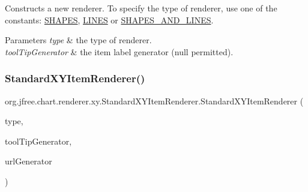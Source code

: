 Constructs a new renderer. To specify the type of renderer, use one of the constants\+: \mbox{\hyperlink{classorg_1_1jfree_1_1chart_1_1renderer_1_1xy_1_1_standard_x_y_item_renderer_a1a41cb6fbaeb923f922123f5c7d59111}{S\+H\+A\+P\+ES}}, \mbox{\hyperlink{classorg_1_1jfree_1_1chart_1_1renderer_1_1xy_1_1_standard_x_y_item_renderer_ad1319e29d63456c4781652b08df84d49}{L\+I\+N\+ES}} or \mbox{\hyperlink{classorg_1_1jfree_1_1chart_1_1renderer_1_1xy_1_1_standard_x_y_item_renderer_a058a54d8d7278e5ee575323faa33ad8a}{S\+H\+A\+P\+E\+S\+\_\+\+A\+N\+D\+\_\+\+L\+I\+N\+ES}}.


\begin{DoxyParams}{Parameters}
{\em type} & the type of renderer. \\
\hline
{\em tool\+Tip\+Generator} & the item label generator ({\ttfamily null} permitted). \\
\hline
\end{DoxyParams}
\mbox{\label{classorg_1_1jfree_1_1chart_1_1renderer_1_1xy_1_1_standard_x_y_item_renderer_ac15ad61a66b81408afc0e616be8a1e5c}} 
\subsubsection{\texorpdfstring{Standard\+X\+Y\+Item\+Renderer()}{StandardXYItemRenderer()}\hspace{0.1cm}{\footnotesize\ttfamily [4/4]}}
{\footnotesize\ttfamily org.\+jfree.\+chart.\+renderer.\+xy.\+Standard\+X\+Y\+Item\+Renderer.\+Standard\+X\+Y\+Item\+Renderer (\begin{DoxyParamCaption}\item[{int}]{type,  }\item[{\mbox{\hyperlink{interfaceorg_1_1jfree_1_1chart_1_1labels_1_1_x_y_tool_tip_generator}{X\+Y\+Tool\+Tip\+Generator}}}]{tool\+Tip\+Generator,  }\item[{\mbox{\hyperlink{interfaceorg_1_1jfree_1_1chart_1_1urls_1_1_x_y_u_r_l_generator}{X\+Y\+U\+R\+L\+Generator}}}]{url\+Generator }\end{DoxyParamCaption})}

